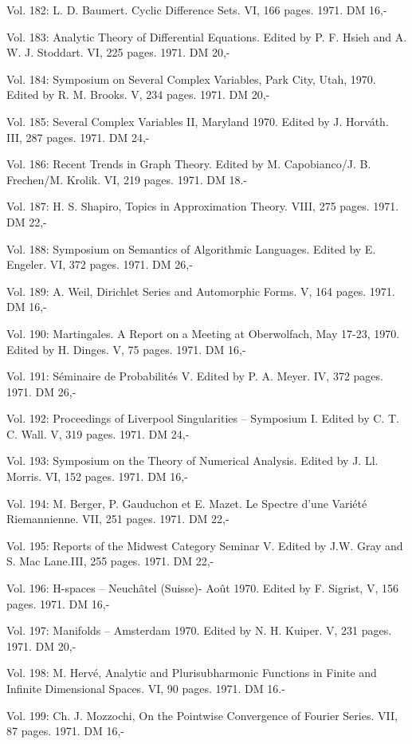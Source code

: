 Vol. 182: L. D. Baumert. Cyclic Difference Sets. VI, 166 pages. 1971. DM 16,-

Vol. 183: Analytic Theory of Differential Equations. Edited by P. F. Hsieh and A. W. J. Stoddart. VI, 225 pages. 1971. DM 20,-

Vol. 184: Symposium on Several Complex Variables, Park City, Utah, 1970. Edited by R. M. Brooks. V, 234 pages. 1971. DM 20,-

Vol. 185: Several Complex Variables II, Maryland 1970. Edited by J. Horváth. III, 287 pages. 1971. DM 24,-

Vol. 186: Recent Trends in Graph Theory. Edited by M. Capobianco/J. B. Frechen/M. Krolik. VI, 219 pages. 1971. DM 18.-

Vol. 187: H. S. Shapiro, Topics in Approximation Theory. VIII, 275 pages. 1971. DM 22,-

Vol. 188: Symposium on Semantics of Algorithmic Languages. Edited by E. Engeler. VI, 372 pages. 1971. DM 26,-

Vol. 189: A. Weil, Dirichlet Series and Automorphic Forms. V, 164 pages. 1971. DM 16,-

Vol. 190: Martingales. A Report on a Meeting at Oberwolfach, May 17-23, 1970. Edited by H. Dinges. V, 75 pages. 1971. DM 16,-

Vol. 191: Séminaire de Probabilités V. Edited by P. A. Meyer. IV, 372 pages. 1971. DM 26,-

Vol. 192: Proceedings of Liverpool Singularities -- Symposium I. Edited by C. T. C. Wall. V, 319 pages. 1971. DM 24,-

Vol. 193: Symposium on the Theory of Numerical Analysis. Edited by J. Ll. Morris. VI, 152 pages. 1971. DM 16,-

Vol. 194: M. Berger, P. Gauduchon et E. Mazet. Le Spectre d'une Variété Riemannienne. VII, 251 pages. 1971. DM 22,-

Vol. 195: Reports of the Midwest Category Seminar V. Edited by J.W. Gray and S. Mac Lane.III, 255 pages. 1971. DM 22,-

Vol. 196: H-spaces -- Neuchâtel (Suisse)- Août 1970. Edited by F. Sigrist, V, 156 pages. 1971. DM 16,-

Vol. 197: Manifolds -- Amsterdam 1970. Edited by N. H. Kuiper. V, 231 pages. 1971. DM 20,-

Vol. 198: M. Hervé, Analytic and Plurisubharmonic Functions in Finite and Infinite Dimensional Spaces. VI, 90 pages. 1971. DM 16.-

Vol. 199: Ch. J. Mozzochi, On the Pointwise Convergence of Fourier Series. VII, 87 pages. 1971. DM 16,-


